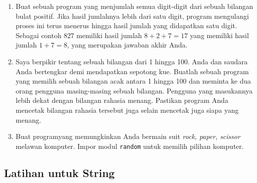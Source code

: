 \documentclass[14pt]{extarticle}
\begin{document}
\begin{enumerate}
	\item Buat sebuah program yang menjumlah semua digit-digit dari sebuah bilangan bulat positif. Jika hasil jumlahnya lebih dari satu digit, program mengulangi proses ini terus menerus hingga hasil jumlah yang didapatkan satu digit. Sebagai contoh $827$ memiliki hasil jumlah $8+2+7=17$ yang memiliki hasil jumlah $1+7=8$, yang merupakan jawaban akhir Anda.
	\item Saya berpikir tentang sebuah bilangan dari 1 hingga 100. Anda dan saudara Anda bertengkar demi mendapatkan sepotong kue. Buatlah sebuah program yang memilih sebuah bilangan acak antara 1 hingga 100 dan meminta ke dua orang pengguna masing-masing sebuah bilangan. Pengguna yang masukannya lebih dekat dengan bilangan rahasia menang. Pastikan program Anda mencetak bilangan rahasia tersebut juga selain mencetak juga siapa yang menang.
	\item Buat programyang memungkinkan Anda bermain suit \emph{rock, paper, scissor} melawan komputer. Impor modul \texttt{random} untuk memilih pilihan komputer.
\end{enumerate}

\subsection{Latihan untuk String}
\end{document}
